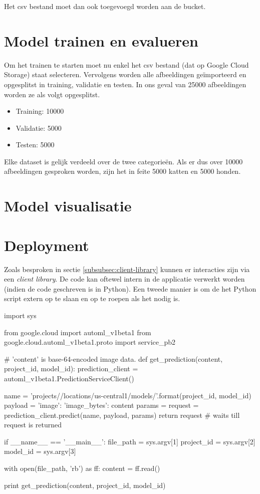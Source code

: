 Het csv bestand moet dan ook toegevoegd worden aan de bucket.

\section{Model trainen en evalueren}
\label{sec:google-automl-train}

Om het trainen te starten moet nu enkel het csv bestand (dat op Google Cloud Storage) staat selecteren. Vervolgens worden alle afbeeldingen geïmporteerd en opgesplitst in training, validatie en testen. In ons geval van 25000 afbeeldingen worden ze als volgt opgesplitst.

\begin{itemize}
    \item Training: 10000
    \item Validatie: 5000
    \item Testen: 5000
\end{itemize}

Elke dataset is gelijk verdeeld over de twee categorieën. Als er dus over 10000 afbeeldingen gesproken worden, zijn het in feite 5000 katten en 5000 honden.

\section{Model visualisatie}
\label{sec:google-automl-visualisation}

\section{Deployment}
\label{sec:google-automl-deployment}

Zoals besproken in sectie \ref{subsubsec:client-library} kunnen er interacties zijn via een \textit{client library}. De code kan oftewel intern in de applicatie verwerkt worden (indien de code geschreven is in Python). Een tweede manier is om de het Python script extern op te slaan en op te roepen als het nodig is.

\bigskip

\begin{python}
import sys

from google.cloud import automl_v1beta1
from google.cloud.automl_v1beta1.proto import service_pb2


# 'content' is base-64-encoded image data.
def get_prediction(content, project_id, model_id):
    prediction_client = automl_v1beta1.PredictionServiceClient()
    
    name = 'projects/{}/locations/us-central1/models/{}'.format(project_id, model_id)
    payload = {'image': {'image_bytes': content }}
    params = {}
    request = prediction_client.predict(name, payload, params)
    return request  # waits till request is returned

if __name__ == '__main__':
    file_path = sys.argv[1]
    project_id = sys.argv[2]
    model_id = sys.argv[3]

    with open(file_path, 'rb') as ff:
        content = ff.read()
    
    print get_prediction(content, project_id, model_id)
\end{python}

